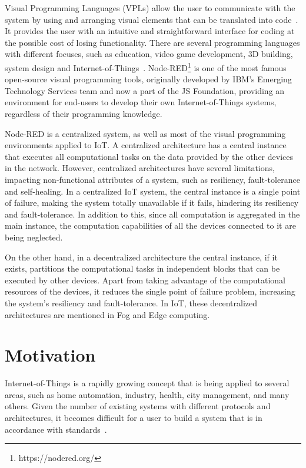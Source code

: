 Visual Programming Languages (VPLs) allow the user to communicate with the system by using and arranging visual elements that can be translated into code~\cite{vpl-book}. It provides the user with an intuitive and straightforward interface for coding at the possible cost of losing functionality. There are several programming languages with different focuses, such as education, video game development, 3D building, system design and Internet-of-Things~\cite{survey_vpl_iot}. Node-RED\footnote{https://nodered.org/} is one of the most famous open-source visual programming tools, originally developed by IBM’s Emerging Technology Services team and now a part of the JS Foundation, providing an environment for end-users to develop their own Internet-of-Things systems, regardless of their programming knowledge.

Node-RED is a centralized system, as well as most of the visual programming environments applied to IoT. A centralized architecture has a central instance that executes all computational tasks on the data provided by the other devices in the network. However, centralized architectures have several limitations, impacting non-functional attributes of a system, such as resiliency, fault-tolerance and self-healing. In a centralized IoT system, the central instance is a single point of failure, making the system totally unavailable if it fails, hindering its resiliency and fault-tolerance. In addition to this, since all computation is aggregated in the main instance, the computation capabilities of all the devices connected to it are being neglected.

On the other hand, in a decentralized architecture the central instance, if it exists, partitions the computational tasks in independent blocks that can be executed by other devices. Apart from taking advantage of the computational resources of the devices, it reduces the single point of failure problem, increasing the system's resiliency and fault-tolerance. In IoT, these decentralized architectures are mentioned in Fog and Edge computing. 

\section{Motivation} \label{sec:motivation}

Internet-of-Things is a rapidly growing concept that is being applied to several areas, such as home automation, industry, health, city management, and many others. Given the number of existing systems with different protocols and architectures, it becomes difficult for a user to build a system that is in accordance with standards~\cite{standard-iot}. 

